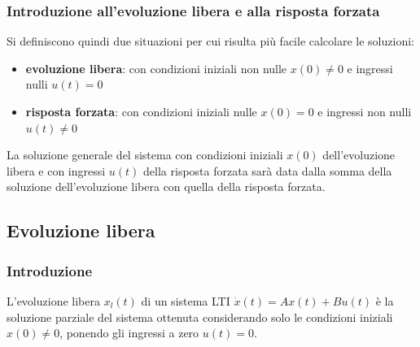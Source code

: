 \subsubsection*{Introduzione all'evoluzione libera e alla risposta forzata}
Si definiscono quindi due situazioni per cui risulta più facile calcolare le soluzioni:
\begin{itemize}
	\item \textbf{evoluzione libera}: con condizioni iniziali non nulle \(x(0) \neq 0\) e  ingressi nulli \(u(t) = 0\)
	\item \textbf{risposta forzata}: con condizioni iniziali nulle \(x(0) = 0\) e ingressi non nulli \(u(t) \neq 0\)
\end{itemize}
La soluzione generale del sistema con condizioni iniziali \(x(0)\) dell'evoluzione libera e con ingressi \(u(t)\) della risposta
forzata sarà data dalla somma della soluzione dell'evoluzione libera con quella della risposta forzata.

\newpage

\subsection{Evoluzione libera}
\subsubsection*{Introduzione}
L'evoluzione libera \(x_l(t)\) di un sistema LTI \(\dot{x}(t) = Ax(t) + Bu(t)\) è la soluzione parziale del sistema ottenuta
considerando solo le condizioni iniziali \(x(0) \neq 0\), ponendo gli ingressi a zero \(u(t) = 0\).

